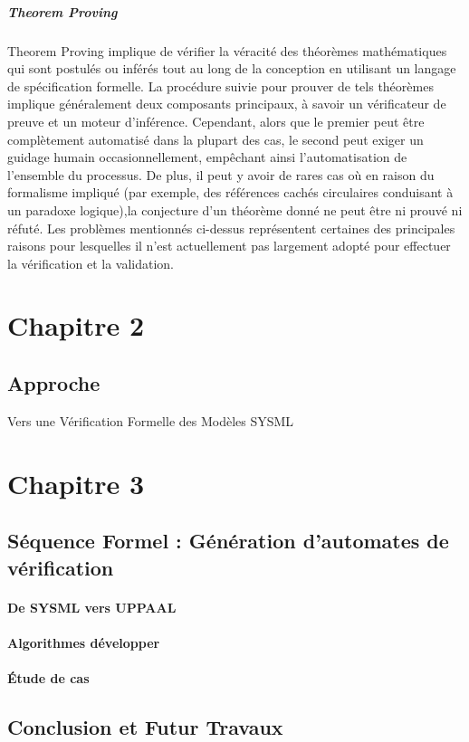 \documentclass[french]{spimufcphdthesis}
\begin{document}
\subsubsection{Theorem Proving}

 Theorem Proving implique de vérifier la véracité des théorèmes mathématiques qui sont postulés ou inférés tout au long de la conception en utilisant un langage de spécification formelle. La procédure suivie pour prouver de tels théorèmes implique généralement deux composants principaux, à savoir un vérificateur de preuve et un moteur d'inférence. Cependant, alors que le premier peut être complètement automatisé dans la plupart des cas, le second peut exiger un guidage humain occasionnellement, empêchant ainsi l'automatisation de l'ensemble du processus.
 De plus, il peut y avoir de rares cas où en raison du formalisme impliqué (par exemple, des références cachés circulaires conduisant à un paradoxe logique),la conjecture d'un théorème donné ne peut être ni prouvé ni réfuté. Les problèmes mentionnés ci-dessus représentent certaines des principales raisons pour lesquelles il n'est actuellement pas largement adopté pour effectuer la vérification et la validation.


\part{Chapitre 2}
\chapter{Approche}
Vers une Vérification Formelle des Modèles SYSML

\part{Chapitre 3}
\chapter{Séquence Formel : Génération d'automates de vérification}
\subsection{De SYSML vers UPPAAL}
\subsection{Algorithmes développer}
\subsection{Étude de cas}

\chapter{Conclusion et Futur Travaux}
\end{document}
